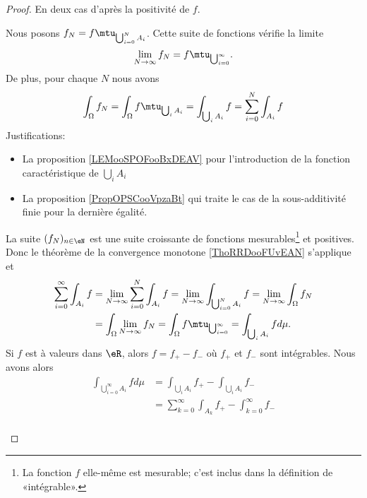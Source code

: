 \begin{proof}
	En deux cas d'après la positivité de \( f\).
	\begin{subproof}
		Nous posons \( f_N=f\mtu_{\bigcup_{i=0}^NA_i}\). Cette suite de fonctions vérifie la limite
		\begin{equation}
			\lim_{N\to \infty} f_N=f\mtu_{\bigcup_{i=0}^{\infty}}.
		\end{equation}
		De plus, pour chaque \( N\) nous avons
		\begin{equation}
			\int_{\Omega}f_N=\int_{\Omega}f\mtu_{\bigcup_iA_i}=\int_{\bigcup_iA_i}f=\sum_{i=0}^N\int_{A_i}f
		\end{equation}
		Justifications:
		\begin{itemize}
			\item La proposition \ref{LEMooSPOFooBxDEAV} pour l'introduction de la fonction caractéristique de \( \bigcup_iA_i\)
			\item La proposition \ref{PropOPSCooVpzaBt} qui traite le cas de la sous-additivité finie pour la dernière égalité.
		\end{itemize}
		La suite \( (f_N)_{n\in \eN}\) est une suite croissante de fonctions mesurables\footnote{La fonction \( f\) elle-même est mesurable; c'est inclus dans la définition de «intégrable».} et positives. Donc le théorème de la convergence monotone \ref{ThoRRDooFUvEAN} s'applique et
		\begin{subequations}
			\begin{align}
				\sum_{i=0}^{\infty}\int_{A_i}f & =\lim_{N\to \infty} \sum_{i=0}^N\int_{A_i}f
				=\lim_{N\to \infty} \int_{\bigcup_{i=0}^{N}A_i}f
				=\lim_{N\to \infty} \int_{\Omega}f_N                                         \\
				                               & =\int_{\Omega}\lim_{N\to \infty} f_N
				=\int_{\Omega}f\mtu_{\bigcup_{i=0}^{\infty}}
				=\int_{\bigcup_iA_i}fd\mu.
			\end{align}
		\end{subequations}
		Si \( f\) est à valeurs dans \( \eR\), alors \( f=f_{+}-f_{-}\) où \( f_{+}\) et \( f_{-}\) sont intégrables. Nous avons alors
		\begin{subequations}
			\begin{align}
				\int_{\bigcup_{i=0}^{\infty}A_i}fd\mu & =\int_{\bigcup_iA_i}f_{+}-\int_{\bigcup_iA_i}f_{-}                                             \\
				                                      & =\sum_{k=0}^{\infty}\int_{A_k}f_+-\int_{k=0}^{\infty}f_-                                       \\

\end{align}
\end{subequations}
\end{subproof}
\end{proof}
